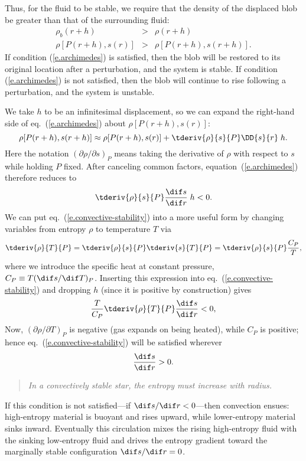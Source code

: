 Thus, for the fluid to be stable, we require that the density of the displaced blob be greater than that of the surrounding fluid:
\begin{eqnarray}
\rho_{b}(r+h) &>& \rho(r+h) \nonumber\\
\rho[P(r+h),s(r)] &>& \rho[P(r+h),s(r+h)].
\label{e.archimedes}
\end{eqnarray}
If condition (\ref{e.archimedes}) is satisfied, then the blob will be restored to its original location after a perturbation, and the system is stable. If condition (\ref{e.archimedes}) is not satisfied, then the blob will continue to rise following a perturbation, and the system is unstable.

We take $h$ to be an infinitesimal displacement, so we can expand the right-hand side of eq.~(\ref{e.archimedes}) about $\rho[P(r+h),s(r)]$:
\[
	\rho[P(r+h),s(r+h)] \approx \rho[P(r+h),s(r)] + \tderiv{\rho}{s}{P}\DD{s}{r}\;h.
\]
Here the notation $(\partial \rho/\partial s)_{P}$ means taking the derivative of $\rho$ with respect to $s$ while holding $P$ fixed. After canceling common factors, equation~(\ref{e.archimedes}) therefore reduces to
\begin{equation}\label{e.convective-stability}
 \tderiv{\rho}{s}{P}\frac{\dif s}{\dif r} \;h < 0 .
\end{equation}
We can put eq.~(\ref{e.convective-stability}) into a more useful form by changing variables from entropy $\rho$ to temperature $T$ via
\[
\tderiv{\rho}{T}{P} = \tderiv{\rho}{s}{P}\tderiv{s}{T}{P} = \tderiv{\rho}{s}{P}\frac{C_{P}}{T},
\]
where we introduce the specific heat at constant pressure, $C_{P}\equiv T(\dif s/\dif T)_{P}$.
Inserting this expression into eq.~(\ref{e.convective-stability}) and dropping $h$ (since it is positive by construction) gives
\[
 \frac{T}{C_{P}}\tderiv{\rho}{T}{P}\frac{\dif s}{\dif r} < 0,
\]
Now, $(\partial \rho/\partial T)_{P}$ is negative (gas expands on being heated), while $C_{P}$ is positive; hence eq.~(\ref{e.convective-stability}) will be satisfied wherever
\begin{equation}\label{e.entropy-condition}
\frac{\dif s}{\dif r} > 0.
\end{equation}
\begin{quote}\itshape
In a convectively stable star, the entropy must increase with radius.
\end{quote}
If this condition is not satisfied---if $\dif s/\dif r < 0$---then convection ensues: high-entropy material is buoyant and rises upward, while lower-entropy material sinks inward. Eventually this circulation mixes the rising high-entropy fluid with the sinking low-entropy fluid and drives the entropy gradient toward the marginally stable configuration $\dif s/\dif r = 0$.

